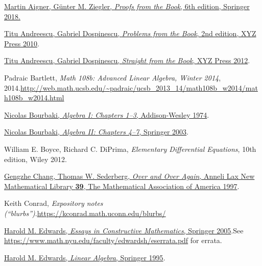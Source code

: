 \documentclass[numbers=enddot,12pt,final,onecolumn,notitlepage]{scrartcl}%
\numberwithin{exer}{subsection}
\theoremstyle{definition}
\begin{document}
\begin{thebibliography}{99999999}                                                                                         %


%
\href{https://doi.org/10.1007/978-3-662-57265-8}{Martin Aigner, G\"{u}nter M.
Ziegler, \textit{Proofs from the Book}, 6th edition, Springer 2018.}

\href{https://bookstore.ams.org/xyz-13}{Titu
Andreescu, Gabriel Dospinescu, \textit{Problems from the Book}, 2nd edition,
XYZ Press 2010}.

\href{https://bookstore.ams.org/xyz-6}{Titu
Andreescu, Gabriel Dospinescu, \textit{Straight from the Book}, XYZ Press
2012}.

Padraic Bartlett, \textit{Math 108b: Advanced
Linear Algebra, Winter 2014}, 2014.\newline\url{http://web.math.ucsb.edu/~padraic/ucsb_2013_14/math108b_w2014/math108b_w2014.html}

%
\href{http://libgen.rs/book/index.php?md5=3270565F6D0052635A1550883588204C}{Nicolas
Bourbaki, \textit{Algebra I: Chapters 1--3}, Addison-Wesley 1974}.

%
\href{http://libgen.rs/book/index.php?md5=F0E3884F2EFB5C1F0B08054605192F6A}{Nicolas
Bourbaki, \textit{Algebra II: Chapters 4--7}, Springer 2003}.

William E. Boyce, Richard C. DiPrima,
\textit{Elementary Differential Equations}, 10th edition, Wiley 2012.

%
\href{https://www.jstor.org/stable/10.4169/j.ctt19b9mbq}{Gengzhe Chang, Thomas
W. Sederberg, \textit{Over and Over Again}, Anneli Lax New Mathematical
Library \textbf{39}, The Mathematical Association of America 1997}.

Keith Conrad, \textit{Expository notes
(\textquotedblleft blurbs\textquotedblright)}.\newline\url{https://kconrad.math.uconn.edu/blurbs/}

%
\href{https://doi.org/10.1007/b138656}{Harold M. Edwards, \textit{Essays in
Constructive Mathematics}, Springer 2005}.\newline See
\url{https://www.math.nyu.edu/faculty/edwardsh/eserrata.pdf} for errata.

%
\href{https://doi.org/10.1007/978-0-8176-4446-8}{Harold M. Edwards,
\textit{Linear Algebra}, Springer 1995}.


\end{thebibliography}
\end{document}
